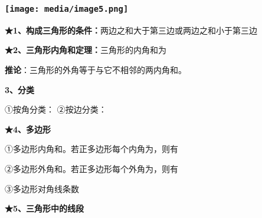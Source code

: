 \documentclass[a4paper,11pt,UTF8]{ctexart}
\begin{document}
\hypertarget{ux5b66ux79d1ux7f51www.zxxk.com--ux6559ux80b2ux8d44ux6e90ux95e8ux6237ux63d0ux4f9bux8bd5ux9898ux8bd5ux5377ux6559ux6848ux8bfeux4ef6ux6559ux5b66ux8bbaux6587ux7d20ux6750ux7b49ux5404ux7c7bux6559ux5b66ux8d44ux6e90ux5e93ux4e0bux8f7dux8fd8ux6709ux5927ux91cfux4e30ux5bccux7684ux6559ux5b66ux8d44ux8baf-8}{%
\subsubsection{\texorpdfstring{\protect\texttt{[image: media/image5.png]}}{学科网(www.zxxk.com)-\/-教育资源门户，提供试题试卷、教案、课件、教学论文、素材等各类教学资源库下载，还有大量丰富的教学资讯！}}\label{ux5b66ux79d1ux7f51www.zxxk.com--ux6559ux80b2ux8d44ux6e90ux95e8ux6237ux63d0ux4f9bux8bd5ux9898ux8bd5ux5377ux6559ux6848ux8bfeux4ef6ux6559ux5b66ux8bbaux6587ux7d20ux6750ux7b49ux5404ux7c7bux6559ux5b66ux8d44ux6e90ux5e93ux4e0bux8f7dux8fd8ux6709ux5927ux91cfux4e30ux5bccux7684ux6559ux5b66ux8d44ux8baf-8}}

\textbf{★1、构成三角形的条件：}两边之和大于第三边或两边之和小于第三边

\textbf{★2、三角形内角和定理：}三角形的内角和为

\textbf{推论}：三角形的外角等于与它不相邻的两内角和。

\textbf{3、分类}

①按角分类： ②按边分类：

\textbf{★4、多边形}

①多边形内角和。若正多边形每个内角为，则有

②多边形外角和。若正多边形每个外角为，则有

③多边形对角线条数

\textbf{★5、三角形中的线段}
\end{document}
